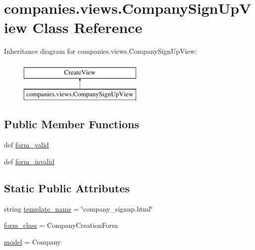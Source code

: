 \hypertarget{classcompanies_1_1views_1_1_company_sign_up_view}{\section{companies.\-views.\-Company\-Sign\-Up\-View Class Reference}
\label{classcompanies_1_1views_1_1_company_sign_up_view}
}
Inheritance diagram for companies.\-views.\-Company\-Sign\-Up\-View\-:\begin{figure}[H]
\begin{center}
\leavevmode
\includegraphics[height=2.000000cm]{classcompanies_1_1views_1_1_company_sign_up_view}
\end{center}
\end{figure}
\subsection*{Public Member Functions}
\begin{DoxyCompactItemize}
\item 
def \hyperlink{classcompanies_1_1views_1_1_company_sign_up_view_af0974c0b2c56ef7212136ecd400b174a}{form\-\_\-valid}
\item 
def \hyperlink{classcompanies_1_1views_1_1_company_sign_up_view_a25c3c639c3a8142a5d34c2cbf7e4faf7}{form\-\_\-invalid}
\end{DoxyCompactItemize}
\subsection*{Static Public Attributes}
\begin{DoxyCompactItemize}
\item 
string \hyperlink{classcompanies_1_1views_1_1_company_sign_up_view_a0faf2d2f999fb9eab072f43d6c902037}{template\-\_\-name} = \char`\"{}company\-\_\-signup.\-html\char`\"{}
\item 
\hyperlink{classcompanies_1_1views_1_1_company_sign_up_view_a9b505d26211824ceae6cc1097cd70bb3}{form\-\_\-class} = Company\-Creation\-Form
\item 
\hyperlink{classcompanies_1_1views_1_1_company_sign_up_view_a0f898ec1c715cc970724de95908e90dc}{model} = Company
\end{DoxyCompactItemize}


